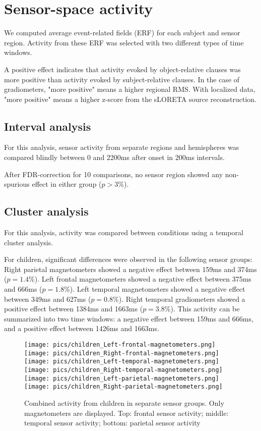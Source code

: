 \section{Sensor-space activity}

We computed average event-related fields (ERF) for each subject and sensor region.
Activity from these ERF was selected with two different types of time windows.

A positive effect indicates that activity evoked by object-relative clauses was more positive than activity evoked by subject-relative clauses. In the case of gradiometers, "more positive" means a higher regional RMS. With localized data, "more positive" means a higher z-score from the sLORETA source reconstruction.


\subsection{Interval analysis}
For this analysis, sensor activity from separate regions and hemispheres was compared blindly between 0 and 2200ms after onset in 200ms intervals.

After FDR-correction for 10 comparisons, no sensor region showed any non-spurious effect in either group ($p > 3\%$).

\subsection{Cluster analysis}
For this analysis, activity was compared between conditions using a temporal cluster analysis.

For children, significant differences were observed in the following sensor groups:
Right parietal magnetometers showed a negative effect between 159ms and 374ms ($p = 1.4\%$).
Left frontal magnetometers showed a negative effect between 375ms and 666ms ($p = 1.8\%$).
Left temporal magnetometers showed a negative effect between 349ms and 627ms ($p = 0.8\%$).
Right temporal gradiometers showed a positive effect between 1384ms and 1663ms ($p = 3.8\%$).
This activity can be summarized into two time windows: a negative effect between 159ms and 666ms, and a positive effect between 1426ms and 1663ms.

\begin{figure}[h]
\begin{center}
\vspace{7mm}
\texttt{[image: pics/children\_Left-frontal-magnetometers.png]}
\texttt{[image: pics/children\_Right-frontal-magnetometers.png]}
\texttt{[image: pics/children\_Left-temporal-magnetometers.png]}
\texttt{[image: pics/children\_Right-temporal-magnetometers.png]}
\texttt{[image: pics/children\_Left-parietal-magnetometers.png]}
\texttt{[image: pics/children\_Right-parietal-magnetometers.png]}
\caption{\label{4.2.activity.kids} Combined activity from children in separate sensor groups. Only magnetometers are displayed. Top: frontal sensor activity; middle: temporal sensor activity; bottom: parietal sensor activity}
\end{center}
\end{figure}


